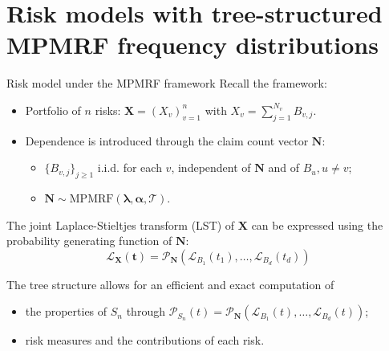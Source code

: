\documentclass[11pt,xcolor={dvipsnames},hyperref={pdftex,pdfpagemode=UseNone,hidelinks,pdfdisplaydoctitle=true},usepdftitle=false]{beamer}
\begin{document}
\section{Risk models with tree-structured MPMRF frequency distributions}
\begin{frame}{Risk model under the MPMRF framework}
Recall the framework: 
\begin{itemize}
    \item Portfolio of $n$ risks: $\boldsymbol{X} = (X_v)_{v=1}^{n}$ with $X_v = \sum_{j=1}^{N_v} B_{v,j}$.
    \vfill
    \item Dependence is introduced through the claim count vector $\boldsymbol{N}$:
    \begin{itemize}
        \item $\{B_{v,j}\}_{j \ge 1}$ i.i.d. for each $v$, independent of $\boldsymbol{N}$ and of $B_u, u \neq v$;
        \vfill    
        \item $\boldsymbol{N} \sim \text{MPMRF}(\boldsymbol{\lambda}, \boldsymbol{\alpha}, \mathcal{T}).$ 
    \end{itemize}
\end{itemize}

\begin{theorem}
The joint Laplace-Stieltjes transform (LST) of $\boldsymbol{X}$ can be expressed using the probability generating function of $\boldsymbol{N}$:
\begin{equation*}
\mathcal{L}_{\boldsymbol{X}}(\boldsymbol{t}) = \mathcal{P}_{\boldsymbol{N}}(\mathcal{L}_{B_1}(t_1), \dots, \mathcal{L}_{B_d}(t_d))
\end{equation*}    
\end{theorem}
The tree structure allows for an efficient and exact computation of
\begin{itemize}
    \item the properties of $S_n$ through $\mathcal{P}_{S_n}(t) =  \mathcal{P}_{\boldsymbol{N}}(\mathcal{L}_{B_1}(t), \dots, \mathcal{L}_{B_d}(t))$;
    \item risk measures and the contributions of each risk.
\end{itemize}
\end{frame}
\end{document}

